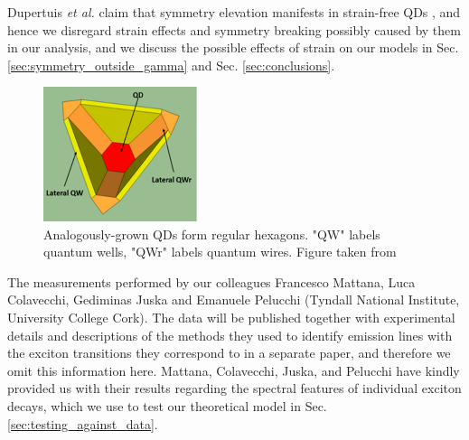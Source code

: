 \documentclass[12pt]{article}
\begin{document}
Dupertuis \textit{et al.} claim that symmetry elevation manifests in strain-free QDs \cite[p. 4]{dupertuis}, and hence we disregard strain effects and symmetry breaking possibly caused by them in our analysis, and we discuss the possible effects of strain on our models in Sec. \ref{sec:symmetry_outside_gamma} and Sec. \ref{sec:conclusions}.\\

\begin{figure}\label{fig:hexagonal_qds}
\begin{center}
    \includegraphics[width=0.4\textwidth]{figures/hexagonal_qds}
 \caption{Analogously-grown QDs form regular hexagons. "QW" labels quantum wells, "QWr" labels quantum wires. Figure taken from \cite[Fig. 1]{hexagon}}
\end{center}
\end{figure}

The measurements performed by our colleagues Francesco Mattana, Luca Colavecchi, Gediminas Juska and Emanuele Pelucchi (Tyndall National Institute, University College Cork). The data will be published together with experimental details and descriptions of the methods they used to identify emission lines with the exciton transitions they correspond to in a separate paper, and therefore we omit this information here. Mattana, Colavecchi, Juska, and Pelucchi have kindly provided us with their results regarding the spectral features of individual exciton decays, which we use to test our theoretical model in Sec. \ref{sec:testing_against_data}. 

\pagebreak








\end{document}
